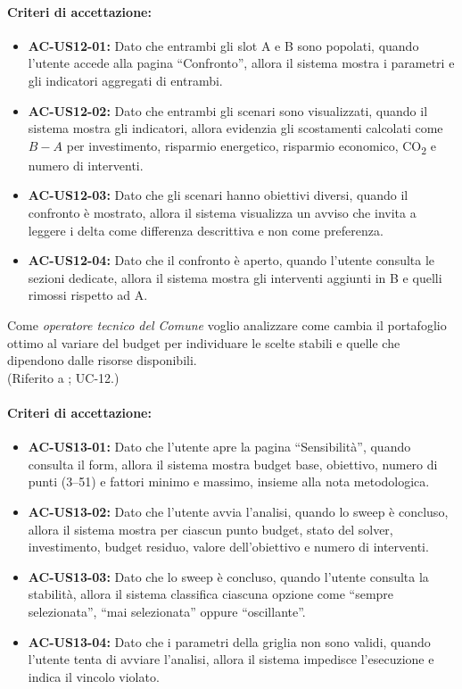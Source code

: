 \paragraph{Criteri di accettazione:}
\begin{itemize}[leftmargin=1.4em]
    \item \textbf{AC-US12-01:} Dato che entrambi gli slot A e B sono popolati, quando l'utente accede alla pagina ``Confronto'', allora il sistema mostra i parametri e gli indicatori aggregati di entrambi.
    \item \textbf{AC-US12-02:} Dato che entrambi gli scenari sono visualizzati, quando il sistema mostra gli indicatori, allora evidenzia gli scostamenti calcolati come $B - A$ per investimento, risparmio energetico, risparmio economico, CO\textsubscript{2} e numero di interventi.
    \item \textbf{AC-US12-03:} Dato che gli scenari hanno obiettivi diversi, quando il confronto è mostrato, allora il sistema visualizza un avviso che invita a leggere i delta come differenza descrittiva e non come preferenza.
    \item \textbf{AC-US12-04:} Dato che il confronto è aperto, quando l'utente consulta le sezioni dedicate, allora il sistema mostra gli interventi aggiunti in B e quelli rimossi rispetto ad A.
\end{itemize}

 \label{us:sensibilita}
Come \textit{operatore tecnico del Comune} voglio analizzare come cambia il portafoglio ottimo al variare del budget per individuare le scelte stabili e quelle che dipendono dalle risorse disponibili. \\ (Riferito a ; UC-12.)

\paragraph{Criteri di accettazione:}
\begin{itemize}[leftmargin=1.4em]
    \item \textbf{AC-US13-01:} Dato che l'utente apre la pagina ``Sensibilità'', quando consulta il form, allora il sistema mostra budget base, obiettivo, numero di punti (3--51) e fattori minimo e massimo, insieme alla nota metodologica.
    \item \textbf{AC-US13-02:} Dato che l'utente avvia l'analisi, quando lo sweep è concluso, allora il sistema mostra per ciascun punto budget, stato del solver, investimento, budget residuo, valore dell'obiettivo e numero di interventi.
    \item \textbf{AC-US13-03:} Dato che lo sweep è concluso, quando l'utente consulta la stabilità, allora il sistema classifica ciascuna opzione come ``sempre selezionata'', ``mai selezionata'' oppure ``oscillante''.
    \item \textbf{AC-US13-04:} Dato che i parametri della griglia non sono validi, quando l'utente tenta di avviare l'analisi, allora il sistema impedisce l'esecuzione e indica il vincolo violato.
\end{itemize}

